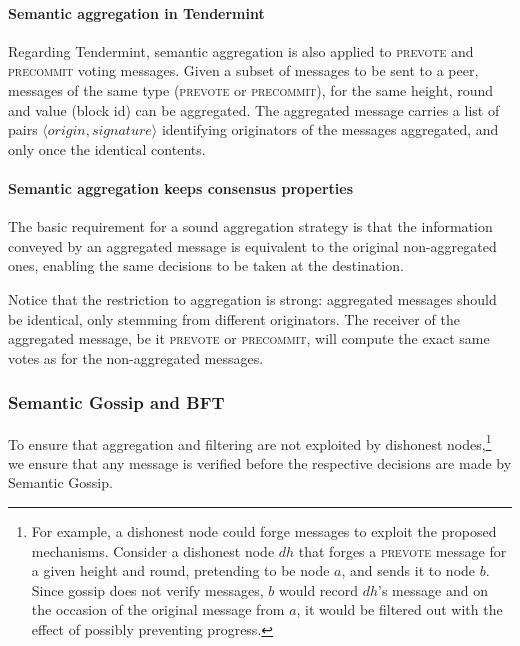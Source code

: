 \paragraph{Semantic aggregation in Tendermint}

Regarding Tendermint, semantic aggregation is also applied to 
\textsc{prevote} and \textsc{precommit} voting messages.
Given a subset of messages to be sent to a peer, messages of the same type (\textsc{prevote} or \textsc{precommit}), for the same height, round and value (block id) can be aggregated.
The aggregated message carries a list of pairs $\langle origin, signature \rangle$ identifying originators of the  messages aggregated, and only once the identical contents.

\paragraph{Semantic aggregation keeps consensus properties}

The basic requirement for a sound aggregation strategy is that the information conveyed by an aggregated message is equivalent to the original non-aggregated ones, enabling the same decisions to be taken at the destination.
%

Notice that the restriction to aggregation is strong: aggregated messages should be identical, only stemming from different originators.   
%
The receiver of the aggregated message, be it \textsc{prevote} or \textsc{precommit}, will compute the exact same votes as for the non-aggregated messages.
%

\subsubsection{Semantic Gossip and BFT}

To ensure that aggregation and filtering are not exploited by dishonest nodes,\footnote{For example, a dishonest node could forge messages to exploit the proposed mechanisms.  Consider a dishonest node $dh$ that forges a \textsc{prevote} message for a given height and round, pretending to be node $a$, and sends it to node $b$.  Since gossip does not verify messages, $b$ would record $dh$'s message and on the occasion of the original message from $a$, it would be filtered out with the effect of possibly preventing progress.} 
we ensure that any message is verified before the respective decisions are made by Semantic Gossip. 




